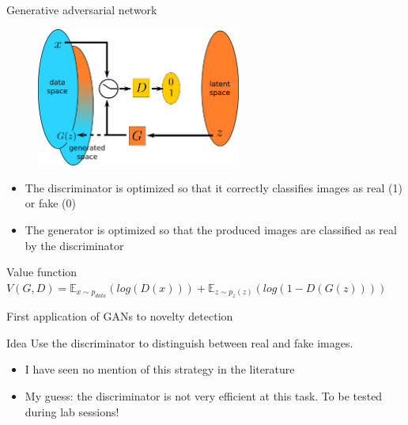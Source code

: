 \documentclass[xcolor=pdftex,dvipsnames,table,mathserif]{beamer}
\begin{document}
\begin{frame}{Generative adversarial network \cite{goodfellow_generative_2014}}

\begin{figure}[ht]
  \centering
  \includegraphics[width=0.6\textwidth]{gan2}
\end{figure}

\begin{itemize}
\item The discriminator is optimized so that it correctly classifies images as real (1) or fake (0)
  \item The generator is optimized so that the produced images are classified as real by the discriminator
\end{itemize}

\begin{block}{Value function}
$V(G,D) = \mathbb{E}_{x \sim p_{data}}(log(D(x))) + \mathbb{E}_{z \sim p_z(z)}(log(1 - D(G(z))))$
\end{block}

\end{frame}


\begin{frame}{First application of GANs to novelty detection}

\begin{block}{Idea}
  Use the discriminator to distinguish between real and fake images.
\end{block}

\begin{itemize}
\item I have seen no mention of this strategy in the literature
\item My guess: the discriminator is not very efficient at this task. To be tested during lab sessions!
\end{itemize}

\end{frame}
\end{document}
